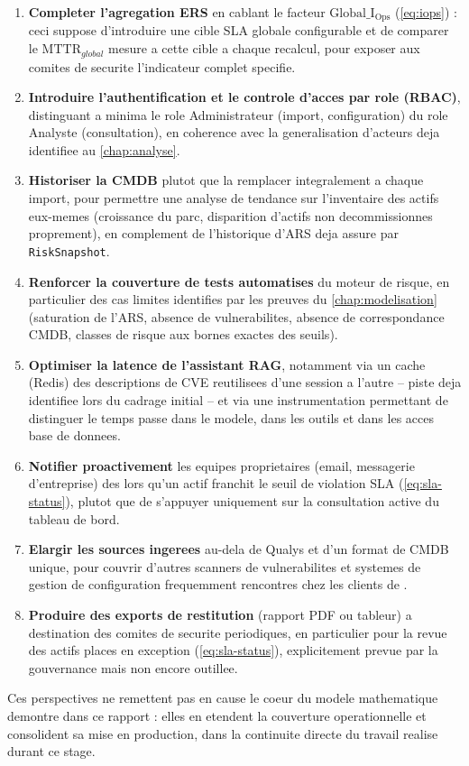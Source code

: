 \begin{enumerate}
  \item \textbf{Completer l'agregation ERS} en cablant le facteur
  $\mathrm{Global\_I_{Ops}}$ (\cref{eq:iops}) : ceci suppose d'introduire une cible
  SLA globale configurable et de comparer le $\mathrm{MTTR}_{global}$ mesure a cette
  cible a chaque recalcul, pour exposer aux comites de securite l'indicateur complet
  specifie.
  \item \textbf{Introduire l'authentification et le controle d'acces par role
  (RBAC)}, distinguant a minima le role Administrateur (import, configuration) du
  role Analyste (consultation), en coherence avec la generalisation d'acteurs deja
  identifiee au \cref{chap:analyse}.
  \item \textbf{Historiser la CMDB} plutot que la remplacer integralement a chaque
  import, pour permettre une analyse de tendance sur l'inventaire des actifs
  eux-memes (croissance du parc, disparition d'actifs non decommissionnes
  proprement), en complement de l'historique d'ARS deja assure par
  \texttt{RiskSnapshot}.
  \item \textbf{Renforcer la couverture de tests automatises} du moteur de risque,
  en particulier des cas limites identifies par les preuves du
  \cref{chap:modelisation} (saturation de l'ARS, absence de vulnerabilites, absence
  de correspondance CMDB, classes de risque aux bornes exactes des seuils).
  \item \textbf{Optimiser la latence de l'assistant RAG}, notamment via un cache
  (Redis) des descriptions de CVE reutilisees d'une session a l'autre -- piste deja
  identifiee lors du cadrage initial -- et via une instrumentation permettant de
  distinguer le temps passe dans le modele, dans les outils et dans les acces base
  de donnees.
  \item \textbf{Notifier proactivement} les equipes proprietaires (email, messagerie
  d'entreprise) des lors qu'un actif franchit le seuil de violation SLA
  (\cref{eq:sla-status}), plutot que de s'appuyer uniquement sur la consultation
  active du tableau de bord.
  \item \textbf{Elargir les sources ingerees} au-dela de Qualys et d'un format de
  CMDB unique, pour couvrir d'autres scanners de vulnerabilites et systemes de
  gestion de configuration frequemment rencontres chez les clients de \organisme.
  \item \textbf{Produire des exports de restitution} (rapport PDF ou tableur) a
  destination des comites de securite periodiques, en particulier pour la revue des
  actifs places en exception (\cref{eq:sla-status}), explicitement prevue par la
  gouvernance mais non encore outillee.
\end{enumerate}

Ces perspectives ne remettent pas en cause le coeur du modele mathematique
demontre dans ce rapport : elles en etendent la couverture operationnelle et
consolident sa mise en production, dans la continuite directe du travail realise
durant ce stage.
